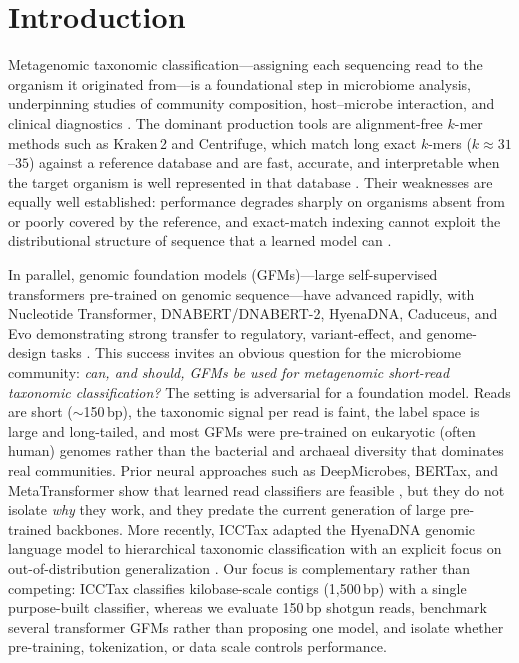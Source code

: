 \section{Introduction}
\label{sec:intro}

Metagenomic taxonomic classification---assigning each sequencing read to the
organism it originated from---is a foundational step in microbiome analysis,
underpinning studies of community composition, host--microbe interaction, and
clinical diagnostics \citep{Quince2017,HMP2012}. The dominant production tools
are alignment-free $k$-mer methods such as Kraken\,2 and Centrifuge, which match
long exact $k$-mers ($k\approx 31$--$35$) against a reference database and are
fast, accurate, and interpretable when the target organism is well represented
in that database \citep{Wood2019,Kim2016}. Their weaknesses are equally
well established: performance degrades sharply on organisms absent from or
poorly covered by the reference, and exact-match indexing cannot exploit the
distributional structure of sequence that a learned model can
\citep{Ye2019,Breitwieser2019,McIntyre2017}.

In parallel, genomic foundation models (GFMs)---large self-supervised
transformers pre-trained on genomic sequence---have advanced rapidly, with
Nucleotide Transformer, DNABERT/DNABERT-2, HyenaDNA, Caduceus, and Evo
demonstrating strong transfer to regulatory, variant-effect, and
genome-design tasks \citep{DallaTorre2023,Ji2021,Zhou2024dnabert2,
Nguyen2023hyena,Schiff2024caduceus,Nguyen2024,Brixi2025}. This success invites
an obvious question for the microbiome community: \emph{can, and should, GFMs be
used for metagenomic short-read taxonomic classification?} The setting is
adversarial for a foundation model. Reads are short ($\sim$150\,bp), the
taxonomic signal per read is faint, the label space is large and
long-tailed, and most GFMs were pre-trained on eukaryotic (often
human) genomes rather than the bacterial and archaeal diversity that
dominates real communities. Prior neural approaches such as DeepMicrobes,
BERTax, and MetaTransformer show that learned read classifiers are feasible
\citep{Liang2020,Mock2022bertax,Wichmann2023}, but they do not isolate
\emph{why} they work, and they predate the current generation of large
pre-trained backbones. More recently, ICCTax adapted the HyenaDNA genomic
language model to hierarchical taxonomic classification with an explicit focus on
out-of-distribution generalization \citep{Gao2025icctax}. Our focus is
complementary rather than competing: ICCTax classifies kilobase-scale contigs
(1{,}500\,bp) with a single purpose-built classifier, whereas we evaluate
150\,bp shotgun reads, benchmark several transformer GFMs rather than proposing
one model, and isolate whether pre-training, tokenization, or data scale
controls performance.

